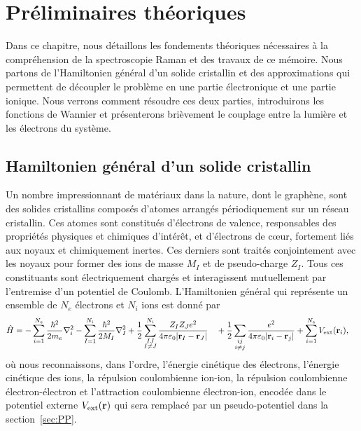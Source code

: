 \chapter{Préliminaires théoriques}\label{chap:théorie}

Dans ce chapitre, nous détaillons les fondements théoriques nécessaires à la compréhension de la spectroscopie Raman et des travaux de ce mémoire. Nous partons de l'Hamiltonien général d'un solide cristallin et des approximations qui permettent de découpler le problème en une partie électronique et une partie ionique. Nous verrons comment résoudre ces deux parties, introduirons les fonctions de Wannier et présenterons brièvement le couplage entre la lumière et les électrons du système.

\section{Hamiltonien général d'un solide cristallin}\label{sec:H_général}

Un nombre impressionnant de matériaux dans la nature, dont le graphène, sont des solides cristallins composés d'atomes arrangés périodiquement sur un réseau cristallin. Ces atomes sont constitués d'électrons de valence, responsables des propriétés physiques et chimiques d'intérêt, et d'électrons de c\oe ur, fortement liés aux noyaux et chimiquement inertes. Ces derniers sont traités conjointement avec les noyaux pour former des ions de masse $M_{I}$ et de pseudo-charge $Z_{I}$. Tous ces constituants sont électriquement chargés et interagissent mutuellement par l'entremise d'un potentiel de Coulomb. L'Hamiltonien général qui représente un ensemble de $N_e$ électrons et $N_i$ ions est donné par
\begin{equation}
\begin{split}
    \hat{H} &= -\sum_{i=1}^{N_e}\frac{\hbar^2}{2m_e}\nabla_i^2
        -\sum_{I=1}^{N_i}\frac{\hbar^2}{2M_I}\nabla_I^2
        +\frac{1}{2}\sum_{\substack{IJ \\ I\neq J}}^{N_i}
        \frac{Z_IZ_Je^2}{4\pi\varepsilon_0|\mathbf{r}_I-\mathbf{r}_J|}
      \quad +\frac{1}{2}\sum_{\substack{ij \\ i\neq j}}
        \frac{e^2}{4\pi\varepsilon_0|\mathbf{r}_i-\mathbf{r}_j|}+\sum_{i=1}^{N_e}V_\text{ext}(\mathbf{r}_i),
\end{split}
\label{eqn:c2_H_general}
\end{equation}
où nous reconnaissons, dans l'ordre, l'énergie cinétique des électrons, l'énergie cinétique des ions, la répulsion coulombienne ion-ion, la répulsion coulombienne électron-électron et l'attraction coulombienne électron-ion, encodée dans le potentiel externe $V_\text{ext}(\mathbf{r})$ qui sera remplacé par un pseudo-potentiel dans la section~\ref{sec:PP}.

